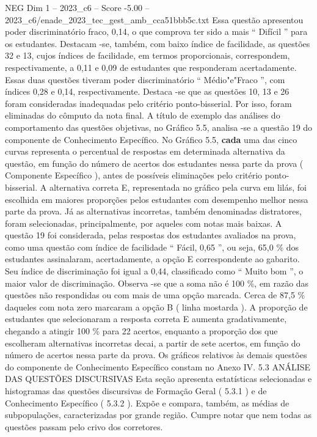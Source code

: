 \begin{textsample}{NEG Dim 1 – 2023\_c6 – Score -5.00 – 2023\_c6/enade\_2023\_tec\_gest\_amb\_cca51bbb5c.txt}
Essa questão apresentou poder discriminatório fraco, 0,14, o que comprova ter sido a mais “ Difícil ” para os estudantes.
Destacam -se, também, com baixo índice de facilidade, as questões 32 e 13, cujos índices de facilidade, em termos proporcionais, correspondem, respectivamente, a 0,11 e 0,09 de estudantes que responderam acertadamente.
Essas duas questões tiveram poder discriminatório “ Médio"e"Fraco ”, com índices 0,28 e 0,14, respectivamente.
Destaca -se que as questões 10, 13 e 26 foram consideradas inadequadas pelo critério ponto-bisserial.
Por isso, foram eliminadas do cômputo da nota final.
A título de exemplo das análises do comportamento das questões objetivas, no Gráfico 5.5, analisa -se a questão 19 do componente de Conhecimento Específico.
No Gráfico 5.5, \textbf{cada} uma das cinco curvas representa o percentual de respostas em determinada alternativa da questão, em função do número de acertos dos estudantes nessa parte da prova ( Componente Específico ), antes de possíveis eliminações pelo critério ponto-bisserial.
A alternativa correta E, representada no gráfico pela curva em lilás, foi escolhida em maiores proporções pelos estudantes com desempenho melhor nessa parte da prova.
Já as alternativas incorretas, também denominadas distratores, foram selecionadas, principalmente, por aqueles com notas mais baixas.
A questão 19 foi considerada, pelas respostas dos estudantes avaliados na prova, como uma questão com índice de facilidade “ Fácil, 0,65 ”, ou seja, 65,0 \% dos estudantes assinalaram, acertadamente, a opção E correspondente ao gabarito.
Seu índice de discriminação foi igual a 0,44, classificado como “ Muito bom ”, o maior valor de discriminação.
Observa -se que a soma não é 100 \%, em razão das questões não respondidas ou com mais de uma opção marcada.
Cerca de 87,5 \% daqueles com nota zero marcaram a opção B ( linha mostarda ).
A proporção de estudantes que selecionaram a resposta correta E aumenta gradativamente, chegando a atingir 100 \% para 22 acertos, enquanto a proporção dos que escolheram alternativas incorretas decai, a partir de sete acertos, em função do número de acertos nessa parte da prova.
Os gráficos relativos às demais questões do componente de Conhecimento Específico constam no Anexo IV. 5.3 ANÁLISE DAS QUESTÕES DISCURSIVAS Esta seção apresenta estatísticas selecionadas e histogramas das questões discursivas de Formação Geral ( 5.3.1 ) e de Conhecimento Específico ( 5.3.2 ).
Expõe e compara, também, as médias de subpopulações, caracterizadas por grande região.
Cumpre notar que nem todas as questões passam pelo crivo dos corretores.

\end{textsample}
